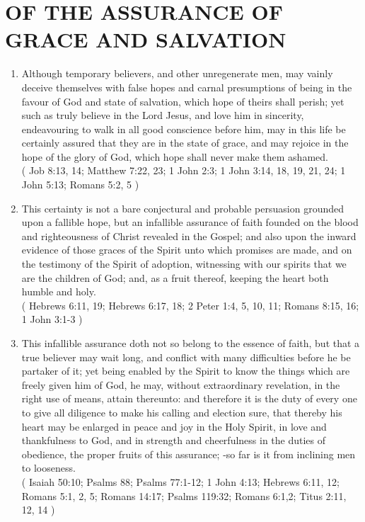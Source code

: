 \documentclass[12pt,a4paper]{book}
\begin{document}
\chapter{OF THE ASSURANCE OF GRACE AND SALVATION}
\label{ch-ass-gra-sal}
\begin{enumerate}
\item
\label{ch-ass-gra-sal-1}
Although temporary believers, and other unregenerate men, may vainly deceive themselves with false hopes and carnal presumptions of being in the favour of God and state of salvation, which hope of theirs shall perish; yet such as truly believe in the Lord Jesus, and love him in sincerity, endeavouring to walk in all good conscience before him, may in this life be certainly assured that they are in the state of grace, and may rejoice in the hope of the glory of God, which hope shall never make them ashamed.\\
( Job 8:13, 14; Matthew 7:22, 23; 1 John 2:3; 1 John 3:14, 18, 19, 21, 24; 1 John 5:13; Romans 5:2, 5 )
\item
\label{ch-ass-gra-sal-2}
This certainty is not a bare conjectural and probable persuasion grounded upon a fallible hope, but an infallible assurance of faith founded on the blood and righteousness of Christ revealed in the Gospel; and also upon the inward evidence of those graces of the Spirit unto which promises are made, and on the testimony of the Spirit of adoption, witnessing with our spirits that we are the children of God; and, as a fruit thereof, keeping the heart both humble and holy.\\
( Hebrews 6:11, 19; Hebrews 6:17, 18; 2 Peter 1:4, 5, 10, 11; Romans 8:15, 16; 1 John 3:1-3 )
\item
\label{ch-ass-gra-sal-3}
This infallible assurance doth not so belong to the essence of faith, but that a true believer may wait long, and conflict with many difficulties before he be partaker of it; yet being enabled by the Spirit to know the things which are freely given him of God, he may, without extraordinary revelation, in the right use of means, attain thereunto: and therefore it is the duty of every one to give all diligence to make his calling and election sure, that thereby his heart may be enlarged in peace and joy in the Holy Spirit, in love and thankfulness to God, and in strength and cheerfulness in the duties of obedience, the proper fruits of this assurance; -so far is it from inclining men to looseness.\\
( Isaiah 50:10; Psalms 88; Psalms 77:1-12; 1 John 4:13; Hebrews 6:11, 12; Romans 5:1, 2, 5; Romans 14:17; Psalms 119:32; Romans 6:1,2; Titus 2:11, 12, 14 )

\end{enumerate}
\end{document}
